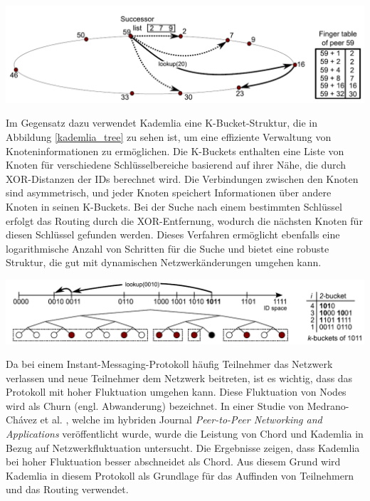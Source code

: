 \begin{center}
    \captionsetup{type=figure}
    \includegraphics[width=0.9\linewidth]{images/chord_ring.png}
    \label{chord_ring}
\end{center}

\noindent Im Gegensatz dazu verwendet Kademlia eine K-Bucket-Struktur, die in Abbildung \ref{kademlia_tree} zu sehen ist, um eine effiziente Verwaltung von Knoteninformationen zu ermöglichen. Die K-Buckets enthalten eine Liste von Knoten für verschiedene Schlüsselbereiche basierend auf ihrer Nähe, die durch XOR-Distanzen der IDs berechnet wird. Die Verbindungen zwischen den Knoten sind asymmetrisch, und jeder Knoten speichert Informationen über andere Knoten in seinen K-Buckets. Bei der Suche nach einem bestimmten Schlüssel erfolgt das Routing durch die XOR-Entfernung, wodurch die nächsten Knoten für diesen Schlüssel gefunden werden. Dieses Verfahren ermöglicht ebenfalls eine logarithmische Anzahl von Schritten für die Suche und bietet eine robuste Struktur, die gut mit dynamischen Netzwerkänderungen umgehen kann.

\begin{center}
    \captionsetup{type=figure}
    \includegraphics[width=0.9\linewidth]{images/kademlia_tree.png}
    \label{kademlia_tree}
\end{center}


\noindent Da bei einem Instant-Messaging-Protokoll häufig Teilnehmer das Netzwerk verlassen und neue Teilnehmer dem Netzwerk beitreten, ist es wichtig, dass das Protokoll mit hoher Fluktuation umgehen kann. Diese Fluktuation von Nodes wird als Churn (engl. Abwanderung) bezeichnet. In einer Studie von Medrano-Chávez et al. \parencite{MedranoChavez_ChordKademliaHighChurnScenarios}, welche im hybriden Journal \textit{Peer-to-Peer Networking and Applications} veröffentlicht wurde, wurde die Leistung von Chord und Kademlia in Bezug auf Netzwerkfluktuation untersucht. Die Ergebnisse zeigen, dass Kademlia bei hoher Fluktuation besser abschneidet als Chord. Aus diesem Grund wird Kademlia in diesem Protokoll als Grundlage für das Auffinden von Teilnehmern und das Routing verwendet.

